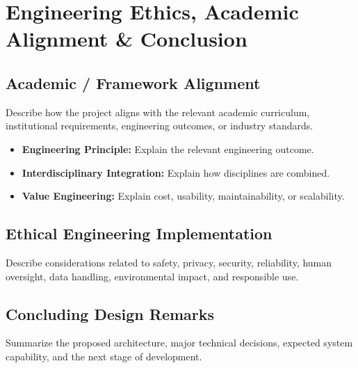 
\section{Engineering Ethics, Academic Alignment \& Conclusion}

\subsection{Academic / Framework Alignment}

Describe how the project aligns with the relevant academic curriculum,
institutional requirements, engineering outcomes, or industry standards.

\begin{itemize}
    \item \textbf{Engineering Principle:} Explain the relevant engineering outcome.
    \item \textbf{Interdisciplinary Integration:} Explain how disciplines are combined.
    \item \textbf{Value Engineering:} Explain cost, usability, maintainability, or scalability.
\end{itemize}

\subsection{Ethical Engineering Implementation}

Describe considerations related to safety, privacy, security, reliability,
human oversight, data handling, environmental impact, and responsible use.

\subsection{Concluding Design Remarks}

Summarize the proposed architecture, major technical decisions,
expected system capability, and the next stage of development.

\newpage
